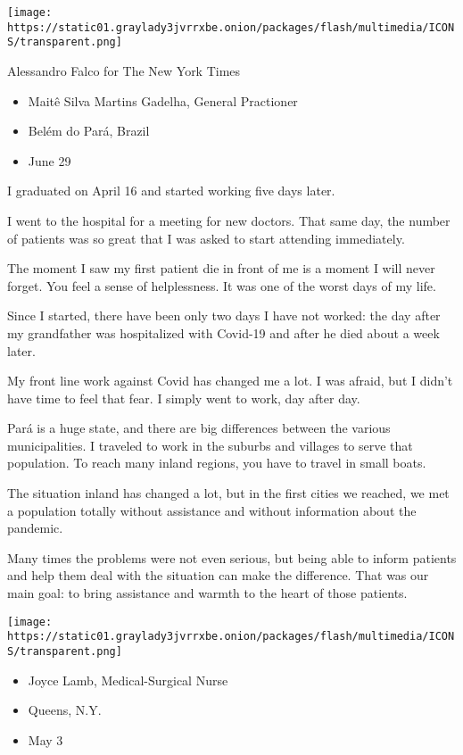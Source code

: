 \texttt{[image: https://static01.graylady3jvrrxbe.onion/packages/flash/multimedia/ICONS/transparent.png]}

Alessandro Falco for The New York Times

\begin{itemize}
\tightlist
\item
  Maitê Silva Martins Gadelha, General Practioner
\item
  Belém do Pará, Brazil
\item
  June 29
\end{itemize}

I graduated on April 16 and started working five days later.

I went to the hospital for a meeting for new doctors. That same day, the
number of patients was so great that I was asked to start attending
immediately.

The moment I saw my first patient die in front of me is a moment I will
never forget. You feel a sense of helplessness. It was one of the worst
days of my life.

Since I started, there have been only two days I have not worked: the
day after my grandfather was hospitalized with Covid-19 and after he
died about a week later.

My front line work against Covid has changed me a lot. I was afraid, but
I didn't have time to feel that fear. I simply went to work, day after
day.

Pará is a huge state, and there are big differences between the various
municipalities. I traveled to work in the suburbs and villages to serve
that population. To reach many inland regions, you have to travel in
small boats.

The situation inland has changed a lot, but in the first cities we
reached, we met a population totally without assistance and without
information about the pandemic.

Many times the problems were not even serious, but being able to inform
patients and help them deal with the situation can make the difference.
That was our main goal: to bring assistance and warmth to the heart of
those patients.

\texttt{[image: https://static01.graylady3jvrrxbe.onion/packages/flash/multimedia/ICONS/transparent.png]}

\begin{itemize}
\tightlist
\item
  Joyce Lamb, Medical-Surgical Nurse
\item
  Queens, N.Y.
\item
  May 3
\end{itemize}

